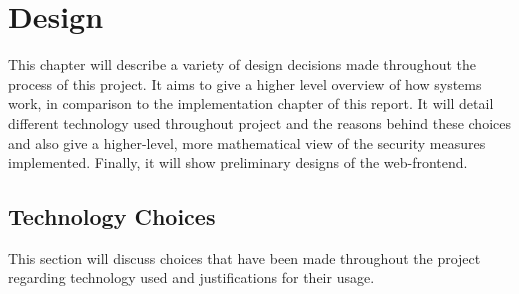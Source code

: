 \chapter{Design} \label{cha:design}
This chapter will describe a variety of design decisions made throughout the process of this project. It aims to give a higher level overview of how systems work, in comparison to the implementation chapter of this report. It will detail different technology used throughout project and the reasons behind these choices and also give a higher-level, more mathematical view of the security measures implemented. Finally, it will show preliminary designs of the web-frontend.

\section{Technology Choices} \label{sec:chapdesign:technology}
This section will discuss choices that have been made throughout the project regarding technology used and justifications for their usage.

